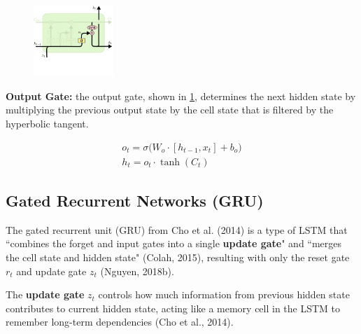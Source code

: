 \begin{program}
\begin{figure}
\begin{center}
    \vspace{-30pt}
    \includegraphics[width=0.27\textwidth]{imgs/lstm_outputGate.png}    
\end{center}
\label{fig:outputGate}
\end{figure}

\ContentFontSize

\textbf{Output Gate: }the output gate, shown in \cref{fig:outputGate}, determines the next hidden state by multiplying the previous output state by the cell state that is filtered by the hyperbolic tangent.

\begin{equation}
\begin{array}{ll}
o_t = \sigma \Big( W_o \cdot [h_{t-1}, x_t] + b_o \Big) \\
h_t = o_t \cdot \tanh(C_t)
\end{array}
\end{equation}

\end{program}


\clearpage


\subsection{Gated Recurrent Networks (GRU)} \label{sec:GRU}

The gated recurrent unit (GRU) from Cho et al. (2014) is a type of LSTM that ``combines the forget and input gates into a single \textbf{update gate}" and ``merges the cell state and hidden state" (Colah, 2015), resulting with only the reset gate $r_t$ and update gate $z_t$ (Nguyen, 2018b). 

The \textbf{update gate} $z_t$ controls how much information from previous hidden state contributes to current hidden state, acting like a memory cell in the LSTM to remember long-term dependencies (Cho et al., 2014). 

